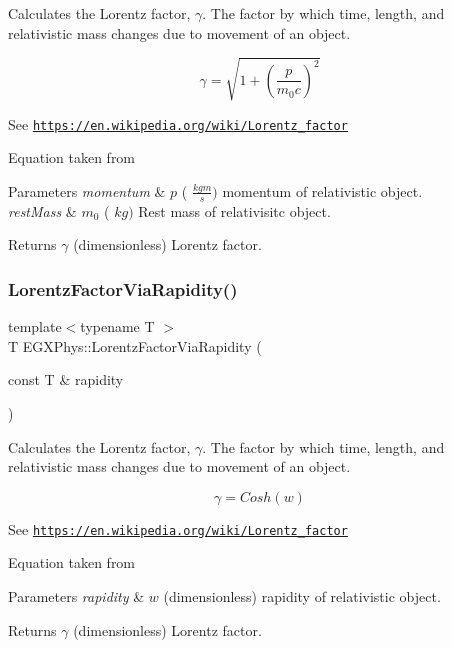 Calculates the Lorentz factor, $\gamma$. The factor by which time, length, and relativistic mass changes due to movement of an object. 

\[\gamma=\sqrt{1+(\frac{p}{m_0 c})^2}\]

See \href{https://en.wikipedia.org/wiki/Lorentz_factor}{\tt https\+://en.\+wikipedia.\+org/wiki/\+Lorentz\+\_\+factor}

Equation taken from


\begin{DoxyParams}{Parameters}
{\em momentum} & $p$ ( $\frac{kg m}{s})$ momentum of relativistic object. \\
\hline
{\em rest\+Mass} & $m_0$ ( $kg)$ Rest mass of relativisitc object. \\
\hline
\end{DoxyParams}
\begin{DoxyReturn}{Returns}
$\gamma$ (dimensionless) Lorentz factor. 
\end{DoxyReturn}
\mbox{\label{group___e_g_x_phys-_lorentz_factor_ga8064f5bce1d2ca5f7bc39d95ba4d2dd9}} 
\subsubsection{\texorpdfstring{Lorentz\+Factor\+Via\+Rapidity()}{LorentzFactorViaRapidity()}}
{\footnotesize\ttfamily template$<$typename T $>$ \\
T E\+G\+X\+Phys\+::\+Lorentz\+Factor\+Via\+Rapidity (\begin{DoxyParamCaption}\item[{const T \&}]{rapidity }\end{DoxyParamCaption})}



Calculates the Lorentz factor, $\gamma$. The factor by which time, length, and relativistic mass changes due to movement of an object. 

\[\gamma=Cosh(w)\]

See \href{https://en.wikipedia.org/wiki/Lorentz_factor}{\tt https\+://en.\+wikipedia.\+org/wiki/\+Lorentz\+\_\+factor}

Equation taken from


\begin{DoxyParams}{Parameters}
{\em rapidity} & $w$ (dimensionless) rapidity of relativistic object. \\
\hline
\end{DoxyParams}
\begin{DoxyReturn}{Returns}
$\gamma$ (dimensionless) Lorentz factor. 
\end{DoxyReturn}
